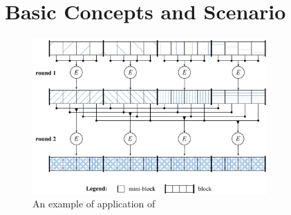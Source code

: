 \section[Background]{Basic Concepts and Scenario}
\label{dcs:sec:background}


\begin{figure}
	\begin{center}
		\includegraphics[width=0.8\textwidth]{figures/bdfprs-fig01}
	\end{center}
	\caption{\label{dcs:fig:mixing}An example of application of \name}
\end{figure}




